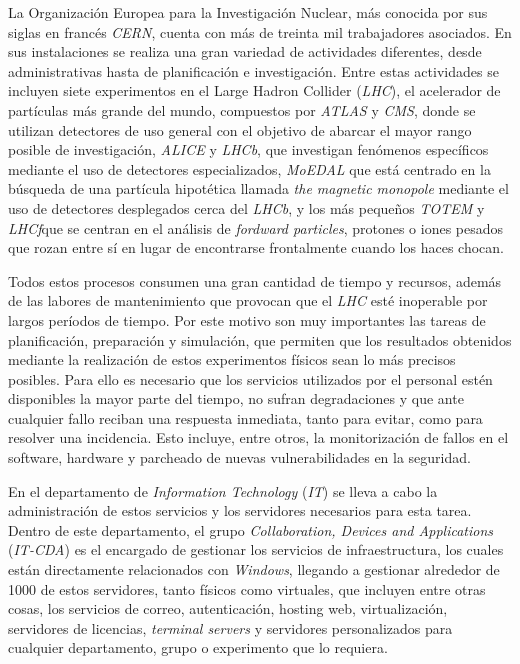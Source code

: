 \label{sec:int}

La Organización Europea para la Investigación Nuclear, más conocida por sus siglas en francés \textit{CERN}, cuenta con más de treinta mil trabajadores asociados. En sus instalaciones se realiza una gran variedad de actividades diferentes, desde administrativas hasta de planificación e investigación. Entre estas actividades se incluyen siete experimentos en el Large Hadron Collider (\textit{LHC}), el acelerador de partículas más grande del mundo, compuestos por \textit{ATLAS} y \textit{CMS}, donde se utilizan detectores de uso general con el objetivo de abarcar el mayor rango posible de investigación, \textit{ALICE} y \textit{LHCb}, que investigan fenómenos específicos mediante el uso de detectores especializados, \textit{MoEDAL} que está centrado en la búsqueda de una partícula hipotética llamada \textit{the magnetic monopole} mediante el uso de detectores desplegados cerca del \textit{LHCb}, y los más pequeños \textit{TOTEM} y \textit{LHCf}que se centran en el análisis de \textit{fordward particles}, protones o iones pesados que rozan entre sí en lugar de encontrarse frontalmente cuando los haces chocan. \cite{lhc}

Todos estos procesos consumen una gran cantidad de tiempo y recursos, además de las labores de mantenimiento que provocan que el \textit{LHC} esté inoperable por largos períodos de tiempo. Por este motivo son muy importantes las tareas de planificación, preparación y simulación, que permiten que los resultados obtenidos mediante la realización de estos experimentos físicos sean lo más precisos posibles. Para ello es necesario que los servicios utilizados por el personal estén disponibles la mayor parte del tiempo, no sufran degradaciones y que ante cualquier fallo reciban una respuesta inmediata, tanto para evitar, como para resolver una incidencia. Esto incluye, entre otros, la monitorización de fallos en el software, hardware y parcheado de nuevas vulnerabilidades en la seguridad.

En el departamento de \textit{Information Technology} (\textit{IT}) se lleva a cabo la administración de estos servicios y los servidores necesarios para esta tarea. Dentro de este departamento, el grupo \textit{Collaboration, Devices and Applications} (\textit{IT-CDA}) es el encargado de gestionar los servicios de infraestructura, los cuales están directamente relacionados con \textit{Windows}, llegando a gestionar alrededor de 1000 de estos servidores, tanto físicos como virtuales, que incluyen entre otras cosas, los servicios de correo, autenticación, hosting web, virtualización, servidores de licencias, \textit{terminal servers} y servidores personalizados para cualquier departamento, grupo o experimento que lo requiera. \cite{infraservicios,infrawindows}

